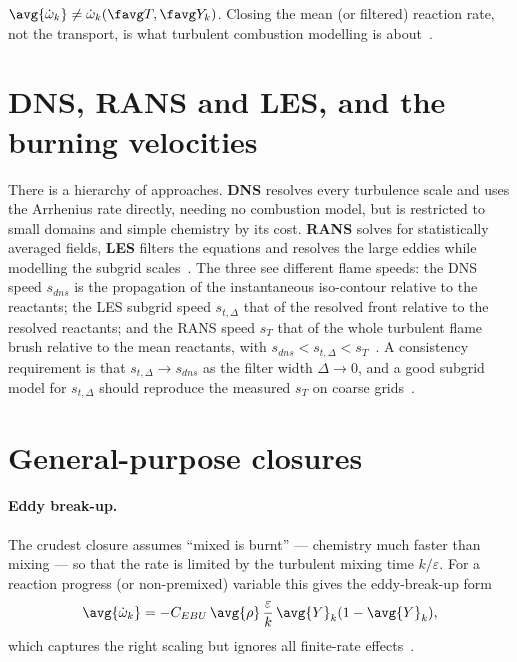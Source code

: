 \begin{keybox}
$\displaystyle \avg{\dot\omega_k}\neq\dot\omega_k(\favg T,\favg Y_k)$. Closing the mean (or filtered) reaction rate, not the transport, is what turbulent combustion modelling is about~\cite{lecture10,veynante2002turbulent}.
\end{keybox}

\section{DNS, RANS and LES, and the burning velocities}

There is a hierarchy of approaches. \textbf{DNS} resolves every turbulence scale and uses the Arrhenius rate directly, needing no combustion model, but is restricted to small domains and simple chemistry by its cost. \textbf{RANS} solves for statistically averaged fields, \textbf{LES} filters the equations and resolves the large eddies while modelling the subgrid scales~\cite{lecture10,pope2000turbulent}. The three see different flame speeds: the DNS speed $s_{dns}$ is the propagation of the instantaneous iso-contour relative to the reactants; the LES subgrid speed $s_{t,\Delta}$ that of the resolved front relative to the resolved reactants; and the RANS speed $s_T$ that of the whole turbulent flame brush relative to the mean reactants, with $s_{dns}<s_{t,\Delta}<s_T$~\cite{lecture10}. A consistency requirement is that $s_{t,\Delta}\to s_{dns}$ as the filter width $\Delta\to0$, and a good subgrid model for $s_{t,\Delta}$ should reproduce the measured $s_T$ on coarse grids~\cite{lecture10}.

\section{General-purpose closures}

\paragraph{Eddy break-up.} The crudest closure assumes ``mixed is burnt'' --- chemistry much faster than mixing --- so that the rate is limited by the turbulent mixing time $k/\varepsilon$. For a reaction progress (or non-premixed) variable this gives the eddy-break-up form
\begin{equation}
\avg{\dot\omega_k}=-C_{EBU}\,\avg{\rho}\,\frac{\varepsilon}{k}\,\avg{Y}_k(1-\avg{Y}_k),
\label{eq:ebu}
\end{equation}
which captures the right scaling but ignores all finite-rate effects~\cite{lecture10,veynante2002turbulent}.


